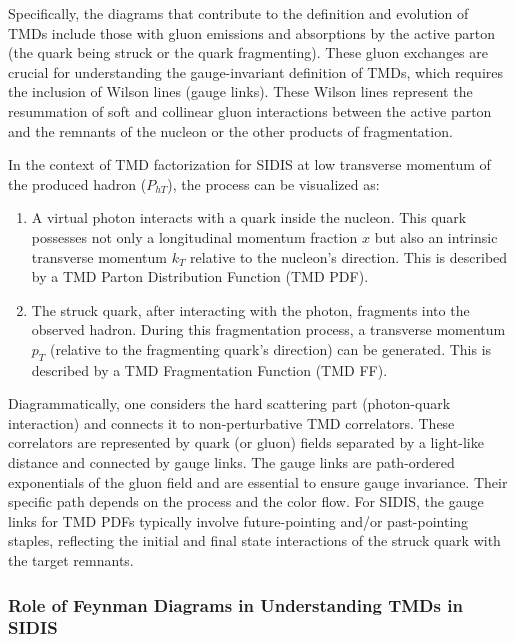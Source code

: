 \documentclass[11pt]{article}
\begin{document}
Specifically, the diagrams that contribute to the definition and evolution of TMDs include those with gluon emissions and absorptions by the active
parton (the quark being struck or the quark fragmenting). These gluon exchanges are crucial for understanding the gauge-invariant definition of TMDs,
which requires the inclusion of Wilson lines (gauge links). These Wilson lines represent the resummation of soft and collinear gluon interactions
between the active parton and the remnants of the nucleon or the other products of fragmentation.

In the context of TMD factorization for SIDIS at low transverse momentum of the produced hadron ($P_{hT}$), the process can be visualized as:
\begin{enumerate}
  \item A virtual photon interacts with a quark inside the nucleon. This quark possesses not only a longitudinal momentum fraction $x$ but also an intrinsic
        transverse momentum $k_T$ relative to the nucleon's direction. This is described by a TMD Parton Distribution Function (TMD PDF).
  \item The struck quark, after interacting with the photon, fragments into the observed hadron. During this fragmentation process, a transverse momentum
        $p_T$ (relative to the fragmenting quark's direction) can be generated. This is described by a TMD Fragmentation Function (TMD FF).
\end{enumerate}

Diagrammatically, one considers the hard scattering part (photon-quark interaction) and connects it to non-perturbative TMD correlators. These
correlators are represented by quark (or gluon) fields separated by a light-like distance and connected by gauge links. The gauge links are
path-ordered exponentials of the gluon field and are essential to ensure gauge invariance. Their specific path depends on the process and the color
flow. For SIDIS, the gauge links for TMD PDFs typically involve future-pointing and/or past-pointing staples, reflecting the initial and final state
interactions of the struck quark with the target remnants.


\subsubsection{Role of Feynman Diagrams in Understanding TMDs in SIDIS}
\end{document}
